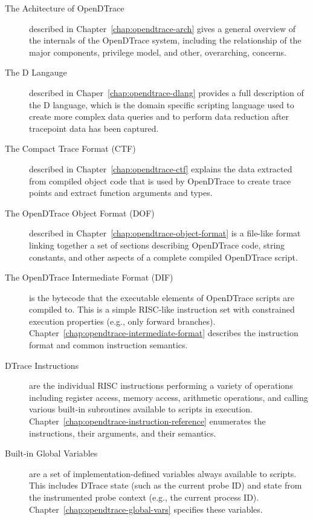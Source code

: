 \begin{description}

\item[The Achitecture of OpenDTrace] described in
  Chapter~\ref{chap:opendtrace-arch} gives a general overview of the
  internals of the OpenDTrace system, including the relationship of
  the major components, privilege model, and other, overarching,
  concerns.

\item[The D Langauge] described in
  Chaper~\ref{chap:opendtrace-dlang} provides a full description of
  the D language, which is the domain specific scripting language used
  to create more complex data queries and to perform data reduction
  after tracepoint data has been captured.

\item[The Compact Trace Format (CTF)] described in
  Chapter~\ref{chap:opendtrace-ctf} explains the data extracted from
  compiled object code that is used by OpenDTrace to create trace
  points and extract function arguments and types.

\item[The OpenDTrace Object Format (DOF)] described in
  Chapter~\ref{chap:opendtrace-object-format} is a file-like format linking
  together a set of sections describing OpenDTrace code, string constants, and
  other aspects of a complete compiled OpenDTrace script.

\item[The OpenDTrace Intermediate Format (DIF)] is the bytecode that the
  executable elements of OpenDTrace scripts are compiled to.
  This is a simple RISC-like instruction set with constrained execution
  properties (e.g., only forward branches).
  Chapter~\ref{chap:opendtrace-intermediate-format} describes the instruction
  format and common instruction semantics.

\item[DTrace Instructions] are the individual RISC instructions
  performing a variety of operations including register access, memory
  access, arithmetic operations, and calling various built-in
  subroutines available to scripts in execution.
  Chapter~\ref{chap:opendtrace-instruction-reference} enumerates the
  instructions, their arguments, and their semantics.

\item[Built-in Global Variables] are a set of implementation-defined
  variables always available to scripts.
  This includes DTrace state (such as the current probe ID) and state from the
  instrumented probe context (e.g., the current process ID).
  Chapter~\ref{chap:opendtrace-global-vars} specifies these variables.


\end{description}
